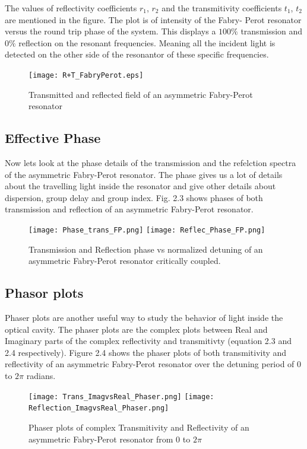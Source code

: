 The values of reflectivity coefficients $r_{1}$, $r_{2}$ and the transmitivity coefficients $t_{1}$, $t_{2}$ are mentioned in the figure. The plot is of intensity of the Fabry- Perot resonator versus the round trip phase of the system. This displays a $100\%$ transmission and $0\%$ reflection on the resonant frequencies. Meaning all the incident light is detected on the other side of the resonantor of these specific frequencies. 

\begin{figure}[h]
\centering
\texttt{[image: R+T\_FabryPerot.eps]}
\caption{Transmitted and reflected field of an asymmetric Fabry-Perot resonator}
\end{figure}

\newpage

\subsection{Effective Phase}
Now lets look at the phase details of the transmission and the refelction spectra of the asymmetric Fabry-Perot resonator. The phase gives us a lot of details about the travelling light inside the resonator and give other details about dispersion, group delay and group index. Fig. 2.3 shows phases of both transmission and reflection of an asymmetric Fabry-Perot resonator.

\begin{figure}[h]
\texttt{[image: Phase\_trans\_FP.png]}
\texttt{[image: Reflec\_Phase\_FP.png]}
\caption{Transmission and Reflection phase vs normalized detuning of an asymmetric Fabry-Perot resonator critically coupled.}
\end{figure}

\subsection{Phasor plots}
Phaser plots are another useful way to study the behavior of light inside the optical cavity. The phaser plots are the complex plots between Real and Imaginary parts of the complex reflectivity and transmitivty (equation 2.3 and 2.4 respectively). Figure 2.4 shows the phaser plots of both transmitivity and reflectivity of an asymmetric Fabry-Perot resonator over the detuning period of 0 to $2\pi$ radians. 

\begin{figure}[h]
\texttt{[image: Trans\_ImagvsReal\_Phaser.png]}
\texttt{[image: Reflection\_ImagvsReal\_Phaser.png]}
\caption{Phaser plots of complex Transmitivity and Reflectivity of an asymmetric Fabry-Perot resonator from 0 to $2\pi$}
\end{figure}


